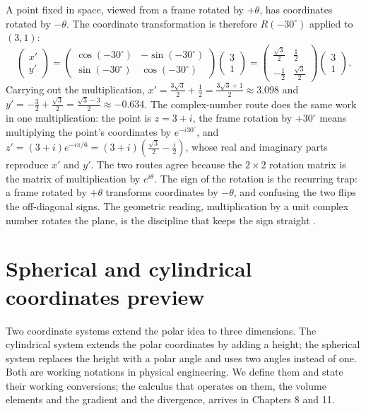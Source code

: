 A point fixed in space, viewed from a frame rotated by $+\theta$,
has coordinates rotated by $-\theta$. The coordinate transformation
is therefore $R(-30^{\circ})$ applied to $(3, 1)$:
\[
\begin{pmatrix} x' \\ y' \end{pmatrix}
= \begin{pmatrix} \cos(-30^{\circ}) & -\sin(-30^{\circ}) \\
\sin(-30^{\circ}) & \cos(-30^{\circ}) \end{pmatrix}
\begin{pmatrix} 3 \\ 1 \end{pmatrix}
= \begin{pmatrix} \tfrac{\sqrt 3}{2} & \tfrac{1}{2} \\
-\tfrac{1}{2} & \tfrac{\sqrt 3}{2} \end{pmatrix}
\begin{pmatrix} 3 \\ 1 \end{pmatrix}.
\]
Carrying out the multiplication, $x' = \tfrac{3\sqrt 3}{2} +
\tfrac{1}{2} = \tfrac{3\sqrt 3 + 1}{2} \approx 3.098$ and $y' =
-\tfrac{3}{2} + \tfrac{\sqrt 3}{2} = \tfrac{\sqrt 3 - 3}{2} \approx
-0.634$. The complex-number route does the same work in one
multiplication: the point is $z = 3 + i$, the frame rotation by
$+30^{\circ}$ means multiplying the point's coordinates by
$e^{-i30^{\circ}}$, and $z' = (3 + i)e^{-i\pi/6} = (3 +
i)(\tfrac{\sqrt 3}{2} - \tfrac{i}{2})$, whose real and imaginary
parts reproduce $x'$ and $y'$. The two routes agree because the
$2\times 2$ rotation matrix is the matrix of multiplication by
$e^{i\theta}$. The sign of the rotation is the recurring trap: a
frame rotated by $+\theta$ transforms coordinates by $-\theta$, and
confusing the two flips the off-diagonal signs. The geometric
reading, multiplication by a unit complex number rotates the plane,
is the discipline that keeps the sign straight
\cite[chapter 1]{text:v2ch03-needham-visual-complex}.

\section{Spherical and cylindrical coordinates preview}

Two coordinate systems extend the polar idea to three dimensions.
The cylindrical system extends the polar coordinates by adding a
height; the spherical system replaces the height with a polar
angle and uses two angles instead of one. Both are working
notations in physical engineering. We define them and state their
working conversions; the calculus that operates on them, the
volume elements and the gradient and the divergence, arrives in
Chapters 8 and 11.

